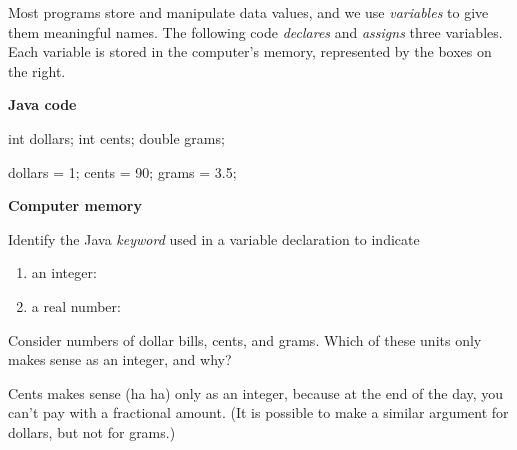 

Most programs store and manipulate data values, and we use \textit{variables} to give them meaningful names.
The following code \emph{declares} and \emph{assigns} three variables.
Each variable is stored in the computer's memory, represented by the boxes on the right.

\vspace{1em}
\hfill
\begin{minipage}[t]{0.5\textwidth}

\textbf{Java code}
\vspace{1ex}

\begin{javalst}
int dollars;
int cents;
double grams;

dollars = 1;
cents = 90;
grams = 3.5;
\end{javalst}

\end{minipage}
\hfill
\begin{minipage}[t]{0.4\textwidth}

\textbf{Computer memory}
\vspace{1em}

\par\vspace{1em}
\par\vspace{1em}

\end{minipage}




\Q Identify the Java \emph{keyword} used in a variable declaration to indicate

\begin{enumerate}
\item an integer: 
\item a real number: 
\end{enumerate}


\Q Consider numbers of dollar bills, cents, and grams.
Which of these units only makes sense as an integer, and why?

\begin{answer}
Cents makes sense (ha ha) only as an integer, because at the end of the day, you can't pay with a fractional amount. (It is possible to make a similar argument for dollars, but not for grams.)
\end{answer}



